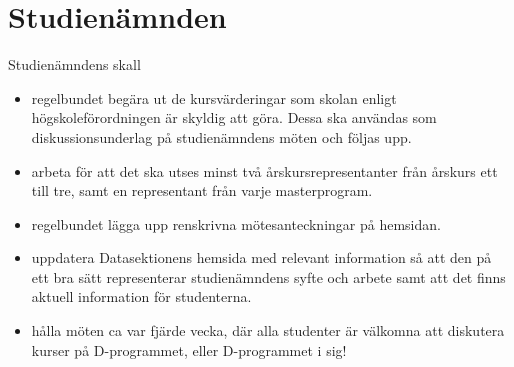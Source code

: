 \documentclass{dgovdoc}
\begin{document}
\section{Studienämnden}

Studienämndens skall

\begin{itemize}
\item regelbundet begära ut de kursvärderingar som skolan enligt
  högskoleförordningen är skyldig att göra. Dessa ska användas som
  diskussionsunderlag på studienämndens möten och följas upp.
\item arbeta för att det ska utses minst två årskursrepresentanter från årskurs
  ett till tre, samt en representant från varje masterprogram.
\item regelbundet lägga upp renskrivna mötesanteckningar på hemsidan.
\item uppdatera Datasektionens hemsida med relevant information så att den på
  ett bra sätt representerar studienämndens syfte och arbete samt att det finns
  aktuell information för studenterna.
\item hålla möten ca var fjärde vecka, där alla studenter är välkomna att
  diskutera kurser på D-programmet, eller D-programmet i sig!
\end{itemize}
\end{document}
